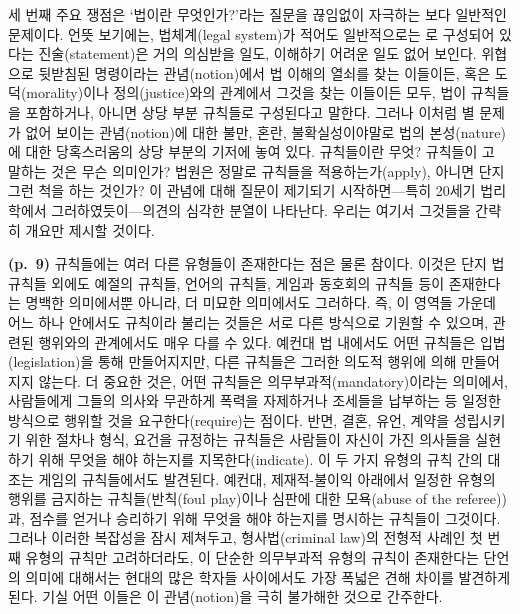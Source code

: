 세 번째 주요 쟁점은 ‘법이란 무엇인가?’라는 질문을 끊임없이 자극하는 보다
일반적인 문제이다. 언뜻 보기에는, 법체계(legal system)가 적어도
일반적으로는 로 구성되어 있다는 진술(statement)은
거의 의심받을 일도, 이해하기 어려운 일도 없어 보인다. 위협으로 뒷받침된
명령이라는 관념(notion)에서 법 이해의 열쇠를 찾는 이들이든, 혹은
도덕(morality)이나 정의(justice)와의 관계에서 그것을 찾는 이들이든 모두,
법이 규칙들을 포함하거나, 아니면 상당 부분 규칙들로 구성된다고 말한다.
그러나 이처럼 별 문제가 없어 보이는 관념(notion)에 대한 불만, 혼란,
불확실성이야말로 법의 본성(nature)에 대한 당혹스러움의 상당 부분의
기저에 놓여 있다. 규칙들이란 무엇? 규칙들이
고 말하는 것은 무슨 의미인가? 법원은 정말로
규칙들을 적용하는가(apply), 아니면 단지 그런 척을 하는 것인가? 이 관념에
대해 질문이 제기되기 시작하면---특히 20세기 법리학에서
그러하였듯이---의견의 심각한 분열이 나타난다. 우리는 여기서 그것들을
간략히 개요만 제시할 것이다.

\textbf{(p.~9)} 규칙들에는 여러 다른 유형들이 존재한다는 점은 물론
참이다. 이것은 단지 법규칙들 외에도 예절의 규칙들, 언어의 규칙들, 게임과
동호회의 규칙들 등이 존재한다는 명백한 의미에서뿐 아니라, 더 미묘한
의미에서도 그러하다. 즉, 이 영역들 가운데 어느 하나 안에서도 규칙이라
불리는 것들은 서로 다른 방식으로 기원할 수 있으며, 관련된 행위와의
관계에서도 매우 다를 수 있다. 예컨대 법 내에서도 어떤 규칙들은
입법(legislation)을 통해 만들어지지만, 다른 규칙들은 그러한 의도적
행위에 의해 만들어지지 않는다. 더 중요한 것은, 어떤 규칙들은
의무부과적(mandatory)이라는 의미에서, 사람들에게 그들의 의사와 무관하게
폭력을 자제하거나 조세들을 납부하는 등 일정한 방식으로 행위할 것을
요구한다(require)는 점이다. 반면, 결혼, 유언, 계약을 성립시키기 위한
절차나 형식, 요건을 규정하는 규칙들은 사람들이 자신이 가진 의사들을
실현하기 위해 무엇을 해야 하는지를 지목한다(indicate). 이 두 가지 유형의
규칙 간의 대조는 게임의 규칙들에서도 발견된다. 예컨대, 제재적-불이익
아래에서 일정한 유형의 행위를 금지하는 규칙들(반칙(foul play)이나 심판에
대한 모욕(abuse of the referee))과, 점수를 얻거나 승리하기 위해 무엇을
해야 하는지를 명시하는 규칙들이 그것이다. 그러나 이러한 복잡성을 잠시
제쳐두고, 형사법(criminal law)의 전형적 사례인 첫 번째 유형의 규칙만
고려하더라도, 이 단순한 의무부과적 유형의 규칙이 존재한다는 단언의
의미에 대해서는 현대의 많은 학자들 사이에서도 가장 폭넓은 견해 차이를
발견하게 된다. 기실 어떤 이들은 이 관념(notion)을 극히 불가해한 것으로
간주한다.

